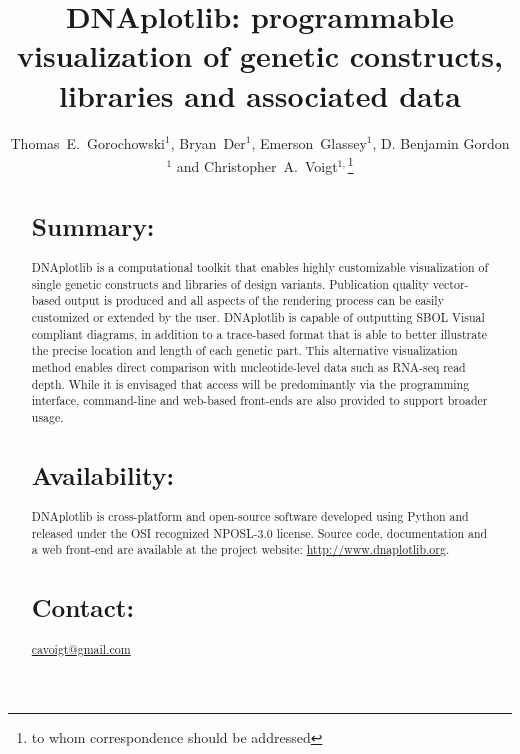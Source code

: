 \documentclass{bioinfo}
\begin{document}

\title[DNAplotlib]{DNAplotlib: programmable visualization of genetic constructs, libraries and associated data}
\author[Thomas E. Gorochowski \textit{et~al.}]{Thomas~E.~Gorochowski$^{1}$, Bryan~Der$^{1}$, Emerson~Glassey$^{1}$, D. Benjamin Gordon$^{1}$ and Christopher~A.~Voigt$^{1,}$\footnote{to whom correspondence should be addressed}}
\address{$^{1}$Department of Biological Engineering, Synthetic Biology Center, Massachusetts Institute of Technology, USA.}



\maketitle

\begin{abstract}

\section{Summary:} 
DNAplotlib is a computational toolkit that enables highly customizable visualization of single genetic constructs and libraries of design variants. Publication quality vector-based output is produced and all aspects of the rendering process can be easily customized or extended by the user. DNAplotlib is capable of outputting SBOL Visual compliant diagrams, in addition to a trace-based format that is able to better illustrate the precise location and length of each genetic part. This alternative visualization method enables direct comparison with nucleotide-level data such as RNA-seq read depth. While it is envisaged that access will be predominantly via the programming interface, command-line and web-based front-ends are also provided to support broader usage.

\section{Availability:}
DNAplotlib is cross-platform and open-source software developed using Python and released under the OSI recognized NPOSL-3.0 license. Source code, documentation and a web front-end are available at the project website: \href{http://www.dnaplotlib.org}{http://www.dnaplotlib.org}.

\section{Contact:} \href{cavoigt@gmail.com}{cavoigt@gmail.com}
\end{abstract}
\end{document}
